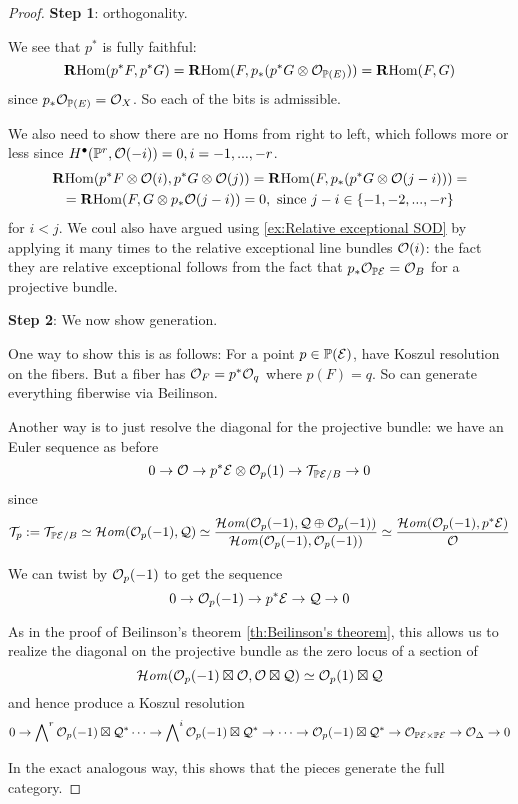 \begin{proof}
    \textbf{Step 1}: orthogonality.

    We see that $p^*$ is fully faithful:
    \begin{equation*}
        \operatorname{\mathbf{R} Hom}(p^*F,p^*G) = \operatorname{\mathbf{R} Hom}(F,p_*(p^*G\otimes\mathcal{O}_{\mathbb{P}(E)})) = \operatorname{\mathbf{R} Hom}(F,G)
    \end{equation*}
    since $p_*\mathcal{O}_{\mathbb{P}(E)}=\mathcal{O}_X$. So each of the bits is admissible.

    We also need to show there are no Homs from right to left, which follows more or less since $H^\bullet(\mathbb{P}^r, \mathcal{O}(-i))=0, i=-1,...,-r$.
    \begin{gather*}
        \operatorname{\mathbf{R} Hom}(p^*F\otimes\mathcal{O}(i),p^*G\otimes\mathcal{O}(j))
            = \operatorname{\mathbf{R} Hom}(F,p_*(p^*G\otimes \mathcal{O}(j-i))) = \\
            = \operatorname{\mathbf{R} Hom}(F,G\otimes p_*\mathcal{O}(j-i)) = 0, \text{ since } j-i\in \{-1,-2,...,-r\}
    \end{gather*}
for $i<j$. We coul also have argued using \ref{ex:Relative exceptional SOD} by applying it many times to the relative exceptional line bundles $\mathcal{O}(i)$: the fact they are relative exceptional follows from the fact that $p_*\mathcal{O}_{\mathbb{P}\mathcal{E}}=\mathcal{O}_B$ for a projective bundle.

\textbf{Step 2}: We now show generation.

One way to show this is as follows: For a point $p\in\mathbb{P}(\mathcal{E})$, have Koszul resolution on the fibers. But a fiber has $\mathcal{O}_F=p^*\mathcal{O}_q$ where $p(F)=q$. So can generate everything fiberwise via Beilinson.

Another way is to just resolve the diagonal for the projective bundle: we have an Euler sequence as before $$0\rightarrow \mathcal{O}\rightarrow p^* \mathcal{E} \otimes \mathcal{O}_{p}(1)\rightarrow \mathcal{T}_{\mathbb{P}\mathcal{E}/B}\rightarrow 0$$since $$\mathcal{T}_p:=\mathcal{T}_{\mathbb{P}\mathcal{E}/B}\simeq \operatorname{\mathcal{H}\mathit{om}}(\mathcal{O}_{p}(-1),\mathcal{Q})\simeq \frac{\operatorname{\mathcal{H}\mathit{om}}(\mathcal{O}_{p}(-1),\mathcal{Q}\oplus \mathcal{O}_{p}(-1))}{\operatorname{\mathcal{H}\mathit{om}} (\mathcal{O}_{p}(-1), \mathcal{O}_{p}(-1))}\simeq \frac{\operatorname{\mathcal{H}\mathit{om}}(\mathcal{O}_{p}(-1), p^* \mathcal{E})}{ \mathcal{O}}$$

We can twist by $\mathcal{O}_p(-1)$ to get the sequence $$0\rightarrow \mathcal{O}_p(-1)\rightarrow p^* \mathcal{E} \rightarrow \mathcal{Q}\rightarrow 0$$

As in the proof of Beilinson's theorem \ref{th:Beilinson's theorem}, this allows us to realize the diagonal on the projective bundle as the zero locus of a section of $$\operatorname{\mathcal{H}\mathit{om}}(\mathcal{O}_p(-1)\boxtimes \mathcal{O}, \mathcal{O}\boxtimes \mathcal{Q})\simeq \mathcal{O}_p(1) \boxtimes \mathcal{Q}$$
and hence produce a Koszul resolution $$0\rightarrow \bigwedge\nolimits^r \mathcal{O}_p(-1) \boxtimes \mathcal{Q}^*\dots\rightarrow \bigwedge\nolimits^i \mathcal{O}_p(-1) \boxtimes \mathcal{Q}^*\rightarrow \dots \rightarrow \mathcal{O}_p(-1) \boxtimes \mathcal{Q}^*\rightarrow \mathcal{O}_{\mathbb{P}\mathcal{E} \times \mathbb{P}\mathcal{E}}\rightarrow \mathcal{O}_{\Delta}\rightarrow 0$$

In the exact analogous way, this shows that the pieces generate the full category.
\end{proof}

